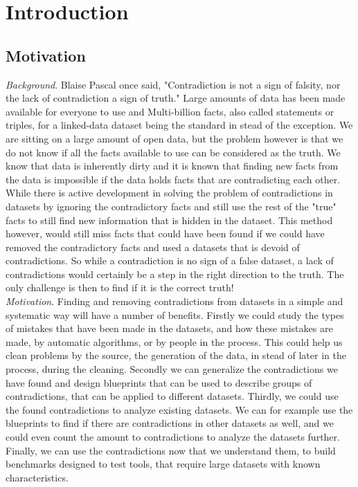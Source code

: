 \documentclass{article}
\begin{document}
\section{Introduction}
\subsection{Motivation}
\textit{Background}. Blaise Pascal once said, "Contradiction is not a sign of falsity, nor the lack of contradiction a sign of truth." Large amounts of data has been made available for everyone to use and Multi-billion facts, also called statements or triples, for a linked-data dataset being the standard in stead of the exception. We are sitting on a large amount of open data, but the problem however is that we do not know if all the facts available to use can be considered as the truth. We know that data is inherently dirty and it is known that finding new facts from the data is impossible if the data holds facts that are contradicting each other. While there is active development in solving the problem of contradictions in datasets by ignoring the contradictory facts and still use the rest of the "true" facts to still find new information that is hidden in the dataset. This method however, would still miss facts that could have been found if we could have removed the contradictory facts and used a datasets that is devoid of contradictions. So while a contradiction is no sign of a false dataset, a lack of contradictions would certainly be a step in the right direction to the truth. The only challenge is then to find if it is the correct truth!\\

\textit{Motivation}. Finding and removing contradictions from datasets in a simple and systematic way will have a number of benefits. Firstly we could study the types of mistakes that have been made in the datasets, and how these mistakes are made, by automatic algorithms, or by people in the process. This could help us clean problems by the source, the generation of the data, in stead of later in the process, during the cleaning. 
Secondly we can generalize the contradictions we have found and design blueprints that can be used to describe groups of contradictions, that can be applied to different datasets. Thirdly, we could use the found contradictions to analyze existing datasets. We can for example use the blueprints to find if there are contradictions in other datasets as well, and we could even count the amount to contradictions to analyze the datasets further. 
Finally, we can use the contradictions now that we understand them, to build benchmarks designed to test tools, that require large datasets with known characteristics.\\
\end{document}
